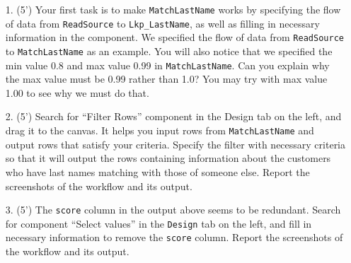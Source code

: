 \begin{enumerate}
\item[1.] (5') Your first task is to make \texttt{MatchLastName} works by specifying the flow of data from \texttt{ReadSource} to \texttt{Lkp\_LastName}, as well as filling in necessary information in the component. We specified the flow of data from \texttt{ReadSource} to \texttt{MatchLastName} as an example. You will also notice that we specified the min value 0.8 and max value 0.99 in \texttt{MatchLastName}. Can you explain why the max value must be 0.99 rather than 1.0? You may try with max value 1.00 to see why we must do that.\\

\item[2.] (5') Search for ``Filter Rows'' component in the Design tab on the left, and drag it to the canvas. It helps you input rows from \texttt{MatchLastName} and output rows that satisfy your criteria. Specify the filter with necessary criteria so that it will output the rows containing information about the customers who  have last names matching with those of someone else. Report the screenshots of the workflow and its output.\\

\item[3.] (5') The \texttt{score} column in the output above seems to be redundant. Search for component ``Select values'' in the \texttt{Design} tab on the left, and fill in necessary information to remove the \texttt{score} column. Report the screenshots of the workflow and its output.
\end{enumerate}